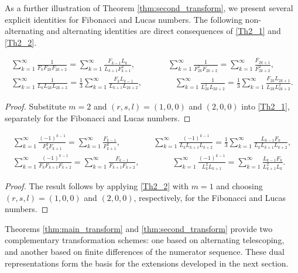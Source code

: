 \documentclass[12pt,reqno]{article}
\begin{document}
As a further illustration of Theorem \ref{thm:second_transform}, we present several explicit identities for Fibonacci and Lucas numbers.
The following non-alternating and alternating identities are direct consequences of \eqref{Th2_1} and \eqref{Th2_2}.
\begin{corollary}
		\begin{gather*}
		\sum_{k=1}^\infty \frac{1}{F_{k} F_{2k} F_{2k+2}} = \sum_{k=1}^\infty \frac{F_{k-1}L_k}{L_{k+1} F_{k+1}^2}, \qquad\qquad 
		\sum_{k=1}^\infty \frac{1}{F_{2k}^2 F_{2k+2}} = \sum_{k=1}^\infty \frac{F_{2k+1}}{F_{2k+2}^2}, \\
		\sum_{k=1}^\infty \frac{1}{L_{k} L_{2k} L_{2k+2}} = \frac{1}{3} \sum_{k=1}^\infty \frac{F_{k}L_{k-1}}{L_{k+1} L_{2k+2}}, \qquad\qquad 
		\sum_{k=1}^\infty \frac{1}{L_{2k}^2 L_{2k+2}} = \frac{1}{3} \sum_{k=1}^\infty \frac{F_{2k}L_{2k+1}}{L_{2k} L_{2k+2}^2}.
		\end{gather*}
\end{corollary}
\begin{proof}
	Substitute $m=2$ and $(r,s,l)=(1,0,0)$ and $(2,0,0)$ into \eqref{Th2_1}, separately for the Fibonacci and Lucas numbers.
\end{proof}
\begin{corollary}
	\begin{gather*}
		\sum_{k=1}^\infty \frac{(-1)^{k-1}}{F^2_{k} F_{k+1}} = \sum_{k=1}^\infty \frac{F_{k-1}}{F^2_{k+1}}, \qquad\qquad 
		\sum_{k=1}^\infty \frac{(-1)^{k-1}}{L_{k}L_{k+1}L_{k+2}} = \frac13\sum_{k=1}^\infty \frac{L_{k-1}F_{k}}{L_{k}L_{k+1}L_{k+2}}, \\
		\sum_{k=1}^\infty \frac{(-1)^{k-1}}{F_{k} F_{k+1} F_{k+2}} = \sum_{k=1}^\infty \frac{F_{k-1}}{F_{k+1} F_{k+2}}, \qquad\qquad 
		\sum_{k=1}^\infty \frac{(-1)^{k-1}}{L_{k}^2 L_{k+1}} =  \sum_{k=1}^\infty \frac{L_{k-1}F_{k}}{L^2_{k+1} L_{k}}.
		\end{gather*}
\end{corollary}
\begin{proof}
	The result follows by applying \eqref{Th2_2} with $m=1$ and choosing $(r,s,l)=(1,0,0)$ and $(2,0,0)$, respectively, for the Fibonacci and Lucas numbers.
\end{proof}

Theorems \ref{thm:main_transform} and \ref{thm:second_transform} provide two complementary transformation schemes: one based on alternating telescoping, and another based on finite differences of the numerator sequence. These dual representations form the basis for the extensions developed in the next section.
\end{document}
